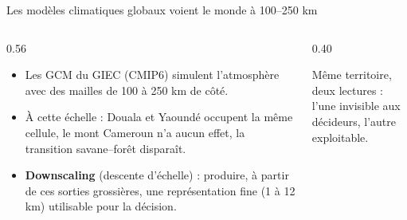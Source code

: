 \documentclass[aspectratio=169,10pt]{beamer}
\begin{document}
\begin{frame}{Les modèles climatiques globaux voient le monde à 100--250 km}
  \begin{columns}[c]
    \begin{column}{0.56\textwidth}
      \begin{itemize}
        \item Les GCM du GIEC (CMIP6) simulent l'atmosphère avec des mailles
              de \alert{100 à 250 km} de côté.
        \item À cette échelle : Douala et Yaoundé occupent \alert{la même cellule},
              le mont Cameroun n'a aucun effet, la transition savane--forêt disparaît.
        \item \textbf{Downscaling} (descente d'échelle) : produire, à partir de ces
              sorties grossières, une représentation fine (\alert{1 à 12 km})
              utilisable pour la décision.
      \end{itemize}
    \end{column}
    \begin{column}{0.40\textwidth}
      \centering

      \vspace{0.3cm}
      {\footnotesize Même territoire, deux lectures : \\ l'une invisible aux décideurs, l'autre exploitable.}
    \end{column}
  \end{columns}
\end{frame}
\end{document}
